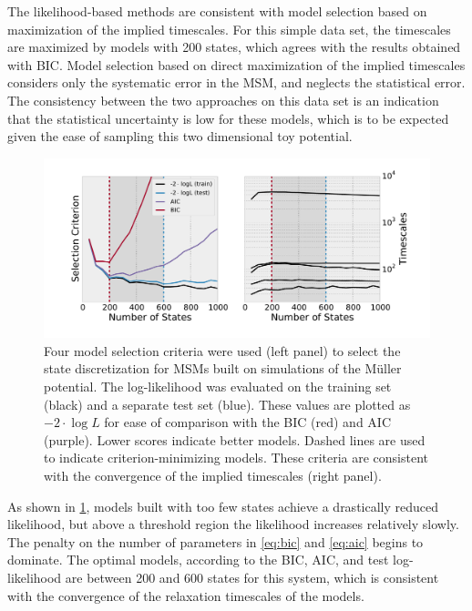 \documentclass[journal=jpcbfk, layout=traditional, manuscript=article]{achemso}
\begin{document}
The likelihood-based methods are consistent with model selection based on maximization of the implied timescales. For this simple data set, the timescales are maximized by models with 200 states, which agrees with the results obtained with BIC. Model selection based on direct maximization of the implied timescales considers only the systematic error in the MSM, and neglects the statistical error. The consistency between the two approaches on this data set is an indication that the statistical uncertainty is low for these models, which is to be expected given the ease of sampling this two dimensional toy potential.



\begin{figure}[h]
\centering
\includegraphics[width=6in]{figs/mull/mull.pdf}
\caption{Four model selection criteria were used (left panel) to select the state discretization for MSMs built on simulations of the M\"{u}ller potential. The log-likelihood was evaluated on the training set (black) and a separate test set (blue). These values are plotted as $-2\cdot \log L$ for ease of comparison with the BIC (red) and AIC (purple). Lower scores indicate better models. Dashed lines are used to indicate criterion-minimizing models. These criteria are consistent with the convergence of the implied timescales (right panel).}
\label{fig:mullerlike}
\end{figure}

As shown in \cref{fig:mullerlike}, models built with too few states achieve a drastically reduced likelihood, but above a threshold region the likelihood increases relatively slowly. The penalty on the number of parameters in \cref{eq:bic} and \cref{eq:aic} begins to dominate. The optimal models, according to the BIC, AIC, and test log-likelihood are between 200 and 600 states for this system, which is consistent with the convergence of the relaxation timescales of the models. 
\end{document}
